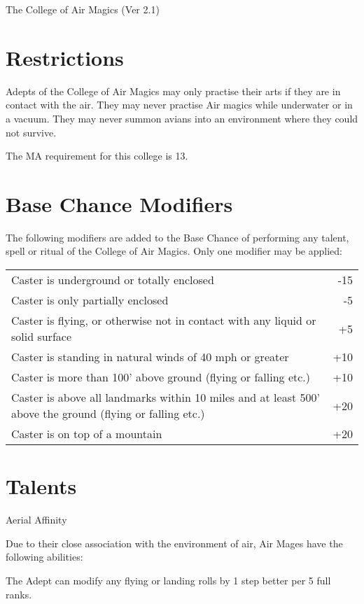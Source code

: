 \begin{Chapter}{The College of Air Magics (Ver 2.1)}
\section{Restrictions}

Adepts of the College of Air Magics may only practise their arts if
they are in contact with the air.  They may never practise Air magics
while underwater or in a vacuum.  They may never summon avians into
an environment where they could not survive.

The MA requirement for this college is 13. 

\section{Base Chance Modifiers}

The following modifiers are added to the Base Chance of performing any
talent, spell or ritual of the College of Air Magics. Only one
modifier may be applied:

\begin{tabularx}{\columnwidth}{Xr}
Caster is underground or totally enclosed 		& -15 \\
Caster is only partially enclosed 			& -5 \\
Caster is flying, or otherwise not in contact with any liquid or solid surface & +5 \\
Caster is standing in natural winds of 40 mph or greater & +10 \\
Caster is more than 100’ above ground (flying or falling etc.) & +10 \\
Caster is above all landmarks within 10 miles and at least 500’ above the ground (flying or falling etc.) & +20 \\
Caster is on top of a mountain & +20 \\
\end{tabularx}

\section{Talents}

\begin{talent}[T-1]{Aerial Affinity}
\begin{effects}
Due to their close association with the environment of air, Air Mages
have the following abilities:
\begin{Enumerate}
\item The Adept can modify any flying or landing rolls by 1 step
  better per 5 full ranks.


\end{Enumerate}
\end{effects}
\end{talent}
\end{Chapter}
